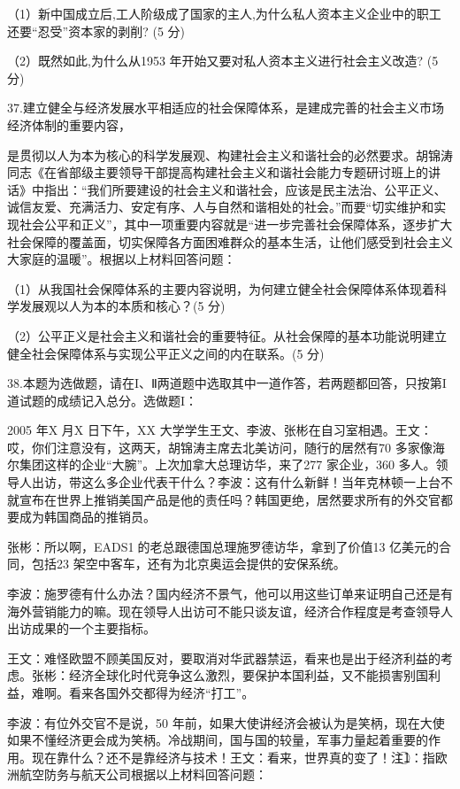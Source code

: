 \documentclass[UTF8,11pt]{ctexart}
\begin{document}
（1）新中国成立后,工人阶级成了国家的主人,为什么私人资本主义企业中的职工还要“忍受”资本家的剥削? (5 分)


（2）既然如此,为什么从1953 年开始又要对私人资本主义进行社会主义改造? (5 分)


37.建立健全与经济发展水平相适应的社会保障体系，是建成完善的社会主义市场经济体制的重要内容，


是贯彻以人为本为核心的科学发展观、构建社会主义和谐社会的必然要求。胡锦涛同志《在省部级主要领导干部提高构建社会主义和谐社会能力专题研讨班上的讲话》中指出：“我们所要建设的社会主义和谐社会，应该是民主法治、公平正义、诚信友爱、充满活力、安定有序、人与自然和谐相处的社会。”而要“切实维护和实现社会公平和正义”，其中一项重要内容就是“进一步完善社会保障体系，逐步扩大社会保障的覆盖面，切实保障各方面困难群众的基本生活，让他们感受到社会主义大家庭的温暖”。根据以上材料回答问题：


（1）从我国社会保障体系的主要内容说明，为何建立健全社会保障体系体现着科学发展观以人为本的本质和核心？(5 分)


（2）公平正义是社会主义和谐社会的重要特征。从社会保障的基本功能说明建立健全社会保障体系与实现公平正义之间的内在联系。(5 分)


38.本题为选做题，请在Ι、Ⅱ两道题中选取其中一道作答，若两题都回答，只按第Ι道试题的成绩记入总分。选做题Ι：

2005 年X 月X 日下午，XX 大学学生王文、李波、张彬在自习室相遇。王文：哎，你们注意没有，这两天，胡锦涛主席去北美访问，随行的居然有70 多家像海尔集团这样的企业“大腕”。上次加拿大总理访华，来了277 家企业，360 多人。领导人出访，带这么多企业代表干什么？李波：这有什么新鲜！当年克林顿一上台不就宣布在世界上推销美国产品是他的责任吗？韩国更绝，居然要求所有的外交官都要成为韩国商品的推销员。

张彬：所以啊，EADS\textcircled{1}的老总跟德国总理施罗德访华，拿到了价值13 亿美元的合同，包括23 架空中客车，还有为北京奥运会提供的安保系统。

李波：施罗德有什么办法？国内经济不景气，他可以用这些订单来证明自己还是有海外营销能力的嘛。现在领导人出访可不能只谈友谊，经济合作程度是考查领导人出访成果的一个主要指标。

王文：难怪欧盟不顾美国反对，要取消对华武器禁运，看来也是出于经济利益的考虑。张彬：经济全球化时代竞争这么激烈，要保护本国利益，又不能损害别国利益，难啊。看来各国外交都得为经济“打工”。

李波：有位外交官不是说，50 年前，如果大使讲经济会被认为是笑柄，现在大使如果不懂经济更会成为笑柄。冷战期间，国与国的较量，军事力量起着重要的作用。现在靠什么？还不是靠经济与技术！王文：看来，世界真的变了！注\textcircled{1}：指欧洲航空防务与航天公司根据以上材料回答问题：
\end{document}
